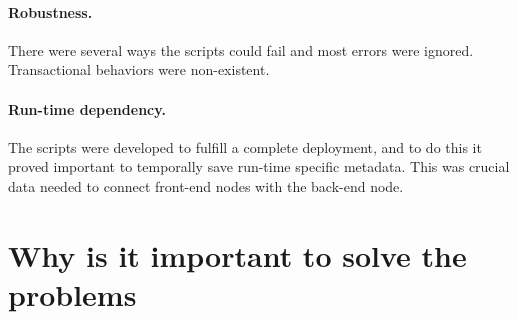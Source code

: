 \paragraph{Robustness.}

There were several ways the scripts could fail and most errors were ignored.
Transactional behaviors were non-existent.

\paragraph{Run-time dependency.}

The scripts were developed to fulfill a complete deployment,
and to do this it proved important to temporally save run-time specific metadata.
This was crucial data needed to connect front-end nodes with the back-end node.


\section{Why is it important to solve the problems}



